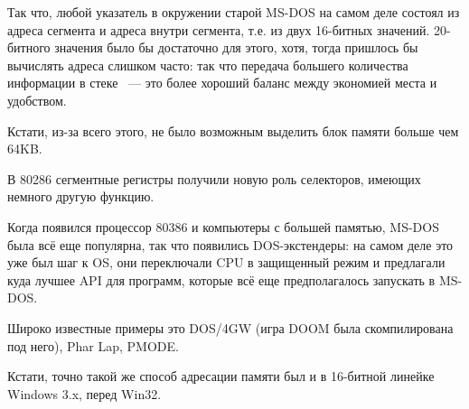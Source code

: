 Так что, любой указатель в окружении старой MS-DOS на самом деле состоял из адреса сегмента
и адреса внутри сегмента, т.е. из двух 16-битных значений. 20-битного значения было бы достаточно для
этого, хотя, тогда пришлось бы вычислять адреса слишком часто: так что передача большего количества
информации в стеке ~--- это более хороший баланс между экономией места и удобством.

Кстати, из-за всего этого, не было возможным выделить блок памяти больше чем 64KB.

В 80286 сегментные регистры получили новую роль селекторов, имеющих немного другую функцию.

Когда появился процессор 80386 и компьютеры с большей памятью,
MS-DOS была всё еще популярна, так что появились DOS-экстендеры: на самом деле это уже был шаг
к  \ac{OS}, они переключали \ac{CPU} в защищенный режим и предлагали куда лучшее \ac{API} для
программ, которые всё еще предполагалось запускать в MS-DOS.

Широко известные примеры это DOS/4GW (игра DOOM была скомпилирована под него), Phar Lap, PMODE.

\par
{}
Кстати, точно такой же способ адресации памяти был и в 16-битной линейке Windows 3.x, перед Win32.

